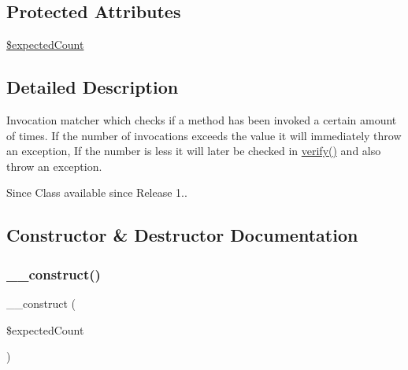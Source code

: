 \subsection*{Protected Attributes}
\begin{DoxyCompactItemize}
\item 
\mbox{\hyperlink{class_p_h_p_unit___framework___mock_object___matcher___invoked_count_a5861df16c81d3b3fab460c7994ba676c}{\$expected\+Count}}
\end{DoxyCompactItemize}


\subsection{Detailed Description}
Invocation matcher which checks if a method has been invoked a certain amount of times. If the number of invocations exceeds the value it will immediately throw an exception, If the number is less it will later be checked in \mbox{\hyperlink{class_p_h_p_unit___framework___mock_object___matcher___invoked_count_aa33600b6a1b28d0c4dfe4d468272aaa4}{verify()}} and also throw an exception.

\begin{DoxySince}{Since}
Class available since Release 1.. 
\end{DoxySince}


\subsection{Constructor \& Destructor Documentation}
\mbox{\label{class_p_h_p_unit___framework___mock_object___matcher___invoked_count_a91b1656c7f6b0a7b3a2cac82d69e5705}} 
\subsubsection{\texorpdfstring{\+\_\+\+\_\+construct()}{\_\_construct()}}
{\footnotesize\ttfamily \+\_\+\+\_\+construct (\begin{DoxyParamCaption}\item[{}]{\$expected\+Count }\end{DoxyParamCaption})}


